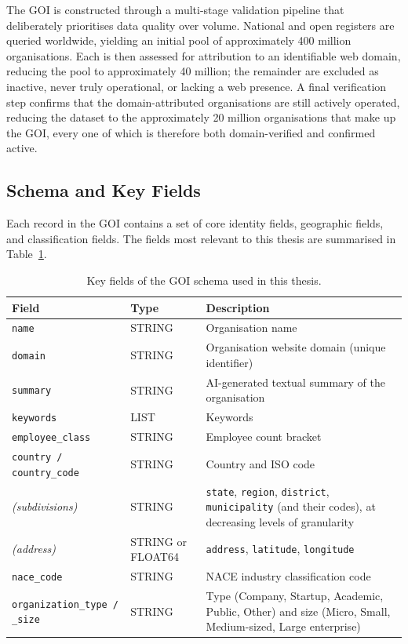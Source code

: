 \documentclass[a4paper,oneside,bibliography=totoc]{scrbook}
\begin{document}
The GOI is constructed through a multi-stage validation pipeline that deliberately prioritises data quality over volume. National and open registers are queried worldwide, yielding an initial pool of approximately 400 million organisations. Each is then assessed for attribution to an identifiable web domain, reducing the pool to approximately 40 million; the remainder are excluded as inactive, never truly operational, or lacking a web presence. A final verification step confirms that the domain-attributed organisations are still actively operated, reducing the dataset to the approximately 20 million organisations that make up the GOI, every one of which is therefore both domain-verified and confirmed active.

\subsection{Schema and Key Fields}
\label{subsec:goi_schema_fields}

Each record in the GOI contains a set of core identity fields, geographic fields, and classification fields. The fields most relevant to this thesis are summarised in Table~\ref{tab:goi_schema}.

\begin{table}[h]
\centering
\caption{Key fields of the GOI schema used in this thesis.}
\label{tab:goi_schema}
\begin{tabularx}{\textwidth}{>{\raggedright\arraybackslash}p{3.5cm}>{\raggedright\arraybackslash}p{1.6cm}X}
\toprule
\textbf{Field} & \textbf{Type} & \textbf{Description} \\
\midrule
\texttt{name}              & STRING  & Organisation name \\
\texttt{domain}            & STRING  & Organisation website domain (unique identifier) \\
\texttt{summary}           & STRING  & AI-generated textual summary of the organisation \\
\texttt{keywords}          & LIST    & Keywords \\
\texttt{employee\_class}            & STRING  & Employee count bracket \\
\texttt{country / country\_code}    & STRING  & Country and ISO code \\
\emph{(subdivisions)}       & STRING  & \texttt{state}, \texttt{region}, \texttt{district}, \texttt{municipality} (and their codes), at decreasing levels of granularity \\
\emph{(address)}            & STRING or FLOAT64 & \texttt{address}, \texttt{latitude}, \texttt{longitude} \\
\texttt{nace\_code}        & STRING  & NACE industry classification code \\
\texttt{organization\_type / \_size}& STRING  & Type (Company, Startup, Academic, Public, Other) and size (Micro, Small, Medium-sized, Large enterprise) \\
\bottomrule
\end{tabularx}
\end{table}
\end{document}

